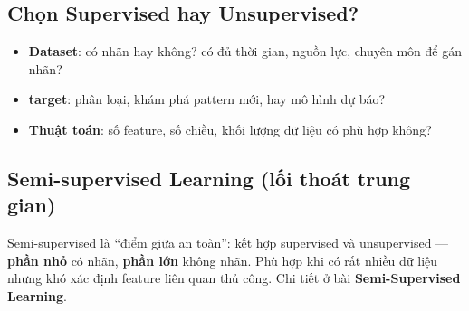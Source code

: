 \subsection{Chọn Supervised hay Unsupervised?}

\begin{phuongphap}[title={Các yếu tố cần xem xét}]
\begin{itemize}
  \item \textbf{Dataset}: có nhãn hay không? có đủ thời gian, nguồn lực, chuyên môn để gán nhãn?
  \item \textbf{target}: phân loại, khám phá pattern mới, hay mô hình dự báo?
  \item \textbf{Thuật toán}: số feature, số chiều, khối lượng dữ liệu có phù hợp không?
\end{itemize}
\end{phuongphap}

\subsection{Semi-supervised Learning (lối thoát trung gian)}

\begin{ynghia}[title={Khi phân vân giữa hai hướng}]
Semi-supervised là ``điểm giữa an toàn'': kết hợp supervised và unsupervised --- \textbf{phần nhỏ} có nhãn, \textbf{phần lớn} không nhãn.
Phù hợp khi có rất nhiều dữ liệu nhưng khó xác định feature liên quan thủ công.
Chi tiết ở bài \textbf{Semi-Supervised Learning}.
\end{ynghia}
